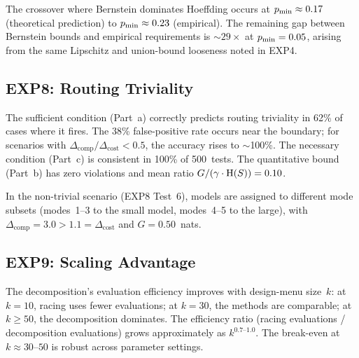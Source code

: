 The crossover where Bernstein dominates Hoeffding occurs at $p_{\min} \approx 0.17$ (theoretical prediction) to $p_{\min} \approx 0.23$ (empirical).
The remaining gap between Bernstein bounds and empirical requirements is $\sim 29\times$ at $p_{\min} = 0.05$, arising from the same Lipschitz and union-bound looseness noted in EXP4.

\subsection{EXP8: Routing Triviality}

The sufficient condition (Part~a) correctly predicts routing triviality in 62\% of cases where it fires.
The 38\% false-positive rate occurs near the boundary; for scenarios with $\Delta_{\mathrm{comp}}/\Delta_{\mathrm{cost}} < 0.5$, the accuracy rises to $\sim$100\%.
The necessary condition (Part~c) is consistent in 100\% of 500~tests.
The quantitative bound (Part~b) has zero violations and mean ratio $G/(\gamma \cdot \mathrm{H}(S)) = 0.10$.

In the non-trivial scenario (EXP8 Test~6), models are assigned to different mode subsets (modes~1--3 to the small model, modes~4--5 to the large), with $\Delta_{\mathrm{comp}} = 3.0 > 1.1 = \Delta_{\mathrm{cost}}$ and $G = 0.50$~nats.

\subsection{EXP9: Scaling Advantage}

The decomposition's evaluation efficiency improves with design-menu size~$k$:
at $k = 10$, racing uses fewer evaluations;
at $k = 30$, the methods are comparable;
at $k \ge 50$, the decomposition dominates.
The efficiency ratio (racing evaluations / decomposition evaluations) grows approximately as $k^{0.7\text{--}1.0}$.
The break-even at $k \approx 30\text{--}50$ is robust across parameter settings.
